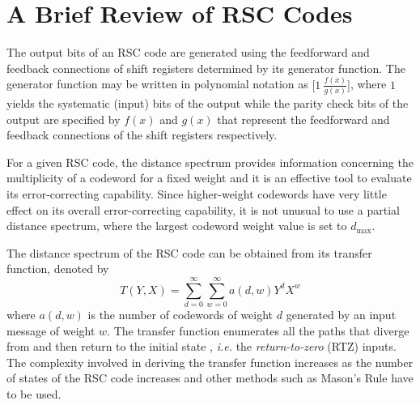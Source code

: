 \section{A Brief Review of RSC Codes}
\label{sec2}
The output bits of an RSC code are generated using the feedforward and feedback connections of shift registers determined by its generator function. The generator function may be written in polynomial notation as $\Big[1 ~\frac{f(x)}{g(x)}\Big]$, where $1$ yields the systematic (input) bits  of the output while the parity check bits of the output are specified by  $f(x)$ and $g(x)$ that represent the feedforward and feedback connections of the shift registers respectively. 

For a given RSC code, the distance spectrum provides information concerning the multiplicity of a codeword for a fixed weight and it is an effective tool to evaluate its error-correcting capability.
Since higher-weight codewords have very little effect on its overall error-correcting capability, it is not unusual to use a partial distance spectrum, where the largest codeword weight value is set to $d_{\text{max}}$. 

The distance spectrum of the RSC code can be obtained from its transfer function, denoted by $$T(Y,X)=\sum_{d=0}^{\infty}\sum_{w=0}^{\infty} a(d,w)Y^dX^w$$ where $a(d,w)$ is the number of codewords of weight $d$ generated by an input message of weight $w$. The transfer function enumerates all the paths that diverge from and then return to the initial state \cite{ref3}, \textit{i.e.} the \textit{return-to-zero} (RTZ) inputs.
The complexity involved in deriving the transfer function increases as the number of states of the RSC code increases and other methods such as Mason's Rule \cite{ref3} have to be used. 

